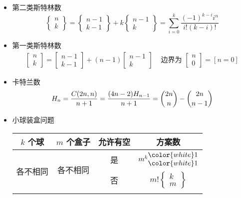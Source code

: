 \begin{itemize}
\item 第二类斯特林数
$$
\begin{Bmatrix}
n \\
k
\end{Bmatrix}
= \begin{Bmatrix}
n - 1 \\
k - 1
\end{Bmatrix}
+ k
\begin{Bmatrix}
n - 1 \\
k
\end{Bmatrix}
= \sum_{i = 0}^{k} \frac{ \left ( -1 \right ) ^ {k - i} i ^ n}{ i ! \left ( k - i \right ) ! }
$$
\item 第一类斯特林数
$$
\begin{array}{lr}
\begin{bmatrix} n \\ k \end{bmatrix}
= \begin{bmatrix} n - 1 \\ k - 1 \end{bmatrix}
+ (n - 1) \begin{bmatrix} n - 1 \\ k \end{bmatrix}
& \text{ 边界为 } \begin{bmatrix} n \\ 0 \end{bmatrix} = [n = 0]
\end{array}
$$
\item 卡特兰数
$$
H_n
= \frac{C (2 n, n)}{n + 1}
= \frac{(4 n - 2) H_{n-1}}{n + 1}
= \dbinom{2 n}{n} - \dbinom{2 n}{n - 1}
$$
\item 小球装盒问题
\begin{center}
\begin{tabular}{|c|c|c|c|}
\hline
$k$ 个球                & $m$ 个盒子               & 允许有空 & 方案数                                                     \\ \hline
\multirow{4}{*}{各不相同} & \multirow{2}{*}{各不相同} & 是    & $m ^ k \begin{matrix} {\color{white}1} \\ {\color{white}1} \end{matrix} $                                                 \\ \cline{3-4}
                      &                       & 否    & $m !  \begin{Bmatrix} k \\ m \end{Bmatrix}$             \\ \cline{2-4}

\end{tabular}
\end{center}
\end{itemize}
